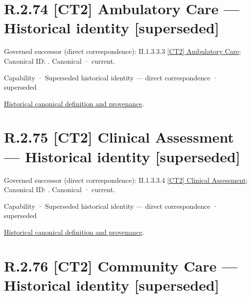 \section*{R.2.74 [CT2] Ambulatory Care — Historical identity [superseded]}
\label{navigation:R.2.74}

{\small Governed successor (direct correspondence): II.1.3.3.3 \hyperref[element:f74d7c3a39c540c4b462576e8f09fc58]{[CT2] Ambulatory Care}; Canonical ID: \texttt{}. Canonical · current.}\par
\label{element:e996b61b6e7b4619913f427aed2b55b1}
{\small Capability · Superseded historical identity — direct correspondence · superseded}\par
\href{../../../../../../../continuum/strategy/capability/e996b61b6e7b4619913f427aed2b55b1.md}{Historical canonical definition and provenance}.\par
\section*{R.2.75 [CT2] Clinical Assessment — Historical identity [superseded]}
\label{navigation:R.2.75}

{\small Governed successor (direct correspondence): II.1.3.3.4 \hyperref[element:a7d84c95e48c453797419813ca80a66c]{[CT2] Clinical Assessment}; Canonical ID: \texttt{}. Canonical · current.}\par
\label{element:1c3b553c87704e27ba211fbbd02d95cb}
{\small Capability · Superseded historical identity — direct correspondence · superseded}\par
\href{../../../../../../../continuum/strategy/capability/1c3b553c87704e27ba211fbbd02d95cb.md}{Historical canonical definition and provenance}.\par
\section*{R.2.76 [CT2] Community Care — Historical identity [superseded]}
\label{navigation:R.2.76}

